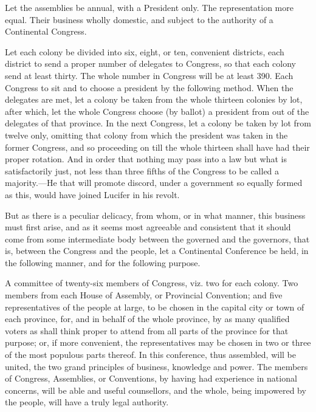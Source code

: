 \documentclass[12pt,oneside]{memoir}
\begin{document}
Let the assemblies be annual, with a President only. The representation more equal. Their business wholly domestic, and subject to the authority of a Continental Congress.

Let each colony be divided into six, eight, or ten, convenient 
districts, each district to send a proper number of delegates to Congress, so that each colony send at least thirty. The whole number in Congress will be at least 390. Each Congress to sit and to choose a president by the following method. When the delegates are met, let a colony be taken from the whole thirteen colonies by lot, after which, let the whole Congress choose (by ballot) a president from out of the delegates of that province. In the next Congress, let a colony be taken by lot from twelve only, omitting that colony from which the president was taken in the former Congress, and so proceeding on till the whole thirteen shall have had their proper rotation. And in order that nothing may pass into a law but what is satisfactorily just, not less than three fifths of the Congress to be called a majority.---He that will promote discord, under a government so equally formed as this, would have joined Lucifer in his revolt.

But as there is a peculiar delicacy, from whom, or in what manner, this business must first arise, and as it seems most agreeable and consistent that it should come from some intermediate body between the governed and the governors, that is, between the Congress and the people, let a Continental Conference be held, in the following manner, and for the following purpose.

A committee of twenty-six members of Congress, viz. two for each colony. Two members from each House of Assembly, or Provincial Convention; and five representatives of the people at large, to be chosen in the capital city or town of each province, for, and in behalf of the whole province, by as many qualified voters as shall think proper to attend from all parts of the province for that purpose; or, if more convenient, the representatives may be chosen in two or three of the most populous parts thereof. In this conference, thus assembled, will be united, the two grand principles of business, knowledge and power. The members of Congress, Assemblies, or Conventions, by having had experience in national concerns, will be able and useful counsellors, and the whole, being impowered by the people, will have a truly legal authority.
\end{document}
